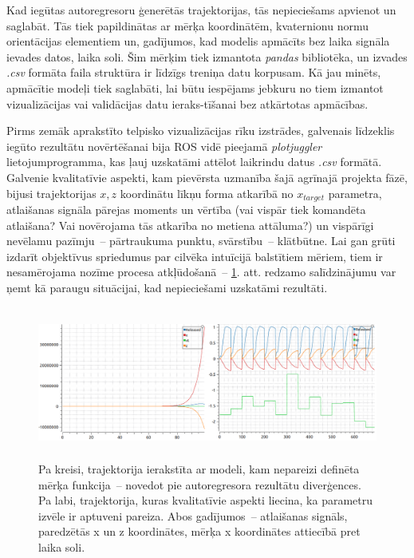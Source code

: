 \documentclass[12pt, a4paper]{article}
\numberwithin{equation}{section} %
\begin{document}
Kad iegūtas autoregresoru ģenerētās trajektorijas, tās nepieciešams apvienot un saglabāt. Tās tiek papildinātas ar mērķa koordinātēm, kvaternionu normu orientācijas elementiem un, gadījumos, kad modelis apmācīts bez laika signāla ievades datos, laika soli.  Šim mērķim tiek izmantota \textit{pandas} bibliotēka, un izvades \textit{.csv} formāta faila struktūra ir līdzīgs treniņa datu korpusam. Kā jau minēts, apmācītie modeļi tiek saglabāti, lai būtu iespējams jebkuru no tiem izmantot vizualizācijas vai validācijas datu ieraks-tīšanai bez atkārtotas apmācības. 

Pirms zemāk aprakstīto telpisko vizualizācijas rīku izstrādes, galvenais līdzeklis iegūto rezultātu novērtēšanai bija ROS vidē pieejamā \textit{plotjuggler} lietojumprogramma, kas ļauj uzskatāmi attēlot laikrindu datus \textit{.csv} formātā. Galvenie kvalitatīvie aspekti, kam pievērsta uzmanība šajā agrīnajā projekta fāzē, bijusi trajektorijas $x, z$ koordinātu līkņu forma atkarībā no $x_{target}$ parametra, atlaišanas signāla pārejas moments un vērtība (vai vispār tiek komandēta atlaišana? Vai novērojama tās atkarība no metiena attāluma?) un vispārīgi nevēlamu pazīmju~-- pārtraukuma punktu, svārstību~-- klātbūtne. Lai gan grūti izdarīt objektīvus spriedumus par cilvēka intuīcijā balstītiem mēriem, tiem ir nesamērojama nozīme procesa atkļūdošanā~-- \ref{plotjug}. att. redzamo salīdzinājumu var ņemt kā paraugu situācijai, kad nepieciešami uzskatāmi rezultāti.

\begin{figure}[t!]
    \centering
    \includegraphics[height=5cm,page=1]{../img/qualitative_plots.png}
    \caption{Pa kreisi, trajektorija ierakstīta ar modeli, kam nepareizi definēta mērķa funkcija~-- novedot pie autoregresora rezultātu diverģences. Pa labi, trajektorija, kuras kvalitatīvie aspekti liecina, ka parametru izvēle ir aptuveni pareiza. Abos gadījumos~-- atlaišanas signāls, paredzētās x un z koordinātes, mērķa x koordinātes attiecībā pret laika soli.}
    \label{plotjug}
\end{figure}
\end{document}
